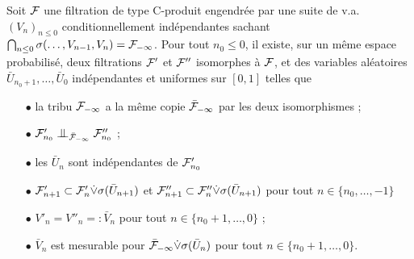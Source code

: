 \documentclass[12pt,a4paper]{article}
\begin{document}
%
%
%
%
%

\begin{lemme}\label{lemme:couplage}
Soit $\mathcal{F}$ une filtration de type C-produit engendrée par 
une suite de v.a.\ ${(V_n)}_{n \leq 0}$  conditionnellement indépendantes 
sachant $\bigcap_{n \leq 0}\sigma(\ldots, V_{n-1}, V_n) = \mathcal{F}_{-\infty}$. 
Pour tout $n_0 \leq 0$, il existe, sur un même espace probabilisé, 
deux filtrations $\mathcal{F}'$ et $\mathcal{F}''$ isomorphes à $\mathcal{F}$, et des variables aléatoires
$\bar U_{n_0+1}, \ldots, \bar U_0$ indépendantes et uniformes sur 
$[0,1]$ telles que 
\begin{itemize}
\item[$\bullet$] la tribu $\mathcal{F}_{-\infty}$ a la m\^eme copie $\bar{\mathcal{F}}_{-\infty}$ par les 
deux isomorphismes ;

\item[$\bullet$] $\FF'_{n_0} \indep_{\bar\FF_{-\infty}} \FF''_{n_0}$ ;

\item[$\bullet$] les $\bar U_n$ sont indépendantes de $\mathcal{F}'_{n_0}$

\item[$\bullet$] $\mathcal{F}'_{n+1} \subset \mathcal{F}'_n \dot{\vee} \sigma(\bar U_{n+1})$ 
et $\mathcal{F}''_{n+1} \subset \mathcal{F}''_n \dot{\vee} \sigma(\bar U_{n+1})$ 
pour tout $n \in \{n_0, \ldots, -1\}$ 

\item[$\bullet$] $V'_n = V''_n =: \bar V_n$ pour tout $n \in \{n_0+1, \ldots, 0\}$ ;

\item[$\bullet$] $\bar V_n$ est mesurable pour $\bar{\mathcal{F}}_{-\infty} \dot{\vee} \sigma(\bar U_n)$ 
pour tout  $n \in \{n_0+1, \ldots, 0\}$.
\end{itemize}
\end{lemme}
\end{document}
